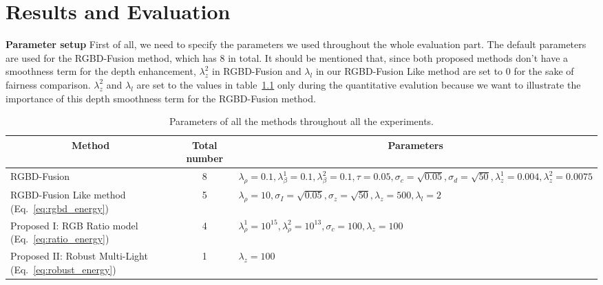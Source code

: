 \chapter{Results and Evaluation} \label{chap:result}
\textbf{Parameter setup}
First of all, we need to specify the parameters we used throughout the whole evaluation part. 
The default parameters are used for the RGBD-Fusion method, which has 8 in total. 
It should be mentioned that, since both proposed methods don't have a smoothness term for the depth enhancement, $\lambda_z^2$ in RGBD-Fusion and $\lambda_l$ in our RGBD-Fusion Like method are set to 0 for the sake of fairness comparison.
$\lambda_z^2$ and $\lambda_l$ are set to the values in table~\ref{tab:parameter_setup} only during the quantitative evalution because we want to illustrate the importance of this depth smoothness term for the RGBD-Fusion method.
\begin{table}[!ht]
\caption{Parameters of all the methods throughout all the experiments.}
\label{tab:parameter_setup}
\centering
\begin{tabular}{|m{4cm} |m{1.5cm} |m{7cm}|}
\hline
\multicolumn{1}{|c|}{Method}                               & \multicolumn{1}{c|}{Total number} & \multicolumn{1}{c|}{Parameters}                                                                                                                                          \\ \hline
RGBD-Fusion~\cite{or2015rgbd} & \multicolumn{1}{c|}{8}            &{$\lambda_\rho = 0.1, \lambda_\beta^1 = 0.1, \lambda_\beta^2 = 0.1, \tau = 0.05, \sigma_c = \sqrt{0.05}, \sigma_d = \sqrt{50}, \lambda_z^1 = 0.004, \lambda_z^2 = 0.0075$} \\ \hline
RGBD-Fusion Like method (Eq.~\ref{eq:rgbd_energy})                    & \multicolumn{1}{c|}{5}             & {$\lambda_{\rho} = 10, \sigma_I = \sqrt{0.05}, \sigma_z = \sqrt{50}, \lambda_z = 500, \lambda_l = 2$}                                                                                                                                                                         \\ \hline
Proposed I: RGB Ratio model (Eq.~\ref{eq:ratio_energy})                            & \multicolumn{1}{c|}{4}             & $\lambda_{\rho}^1 = 10^{15}, \lambda_{\rho}^2 = 10^{13}, \sigma_c = 100, \lambda_z = 100$                                                                                                                                                                                                                                                                                                                                                  \\ \hline
Proposed II: Robust Multi-Light  (Eq.~\ref{eq:robust_energy})                        & \multicolumn{1}{c|}{1}            & $\lambda_z = 100$                                                                                                                                                                          \\ \hline
\end{tabular}
\end{table}

